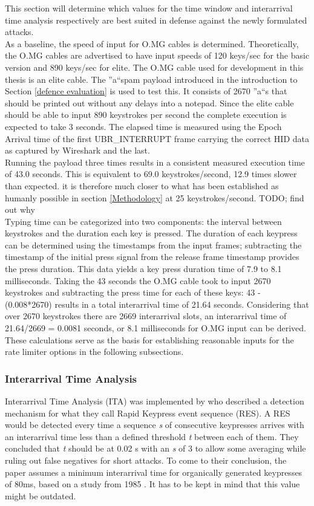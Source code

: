 This section will determine which values for the time window and interarrival time analysis respectively are best suited in defense against the newly formulated attacks.\\
As a baseline, the speed of input for O.MG cables is determined. Theoretically, the O.MG cables are advertised to have input speeds of 120 keys/sec for the basic version and 890 keys/sec for elite. The O.MG cable used for development in this thesis is an elite cable. The ''a``spam payload introduced in the introduction to Section \ref{defence evaluation} is used to test this. It consists of 2670 ''a``s that should be printed out without any delays into a notepad. Since the elite cable should be able to input 890 keystrokes per second the complete execution is expected to take 3 seconds. The elapsed time is measured using the Epoch Arrival time of the first UBR\_INTERRUPT frame carrying the correct HID data as captured by Wireshark and the last. \\
Running the payload three times results in a consistent measured execution time of 43.0 seconds. This is equivalent to 69.0 keystrokes/second, 12.9 times slower than expected. it is therefore much closer to what has been established as humanly possible in section \ref{Methodology} at 25 keystrokes/second. TODO; find out why \\
Typing time can be categorized into two components: the interval between keystrokes and the duration each key is pressed. The duration of each keypress can be determined using the timestamps from the input frames; subtracting the timestamp of the initial press signal from the release frame timestamp provides the press duration. This data yields a key press duration time of 7.9 to 8.1 milliseconds. Taking the 43 seconds the O.MG cable took to input 2670 keystrokes and subtracting the press time for each of these keys: 43 - (0.008*2670) results in a total interarrival time of 21.64 seconds. Considering that over 2670 keystrokes there are 2669 interarrival slots, an interarrival time of 21.64/2669 = 0.0081 seconds, or 8.1 milliseconds for O.MG input can be derived. These calculations serve as the basis for establishing reasonable inputs for the rate limiter options in the following subsections.  

\subsubsection{Interarrival Time Analysis}


Interarrival Time Analysis (ITA) was implemented by \cite{neunerUSBlockBlockingUSBBased2018} who described a detection mechanism for what they call Rapid Keypress event sequence (RES). A RES would be detected every time a sequence \emph{s} of consecutive keypresses arrives with an interarrival time less than a defined threshold \emph{t} between each of them. They concluded that \emph{t} should be at 0.02 s with an \emph{s} of 3 to allow some averaging while ruling out false negatives for short attacks. To come to their conclusion, the paper assumes a minimum interarrival time for organically generated keypresses of 80ms, based on a study from 1985 \cite{umphressIdentityVerificationKeyboard1985}. It has to be kept in mind that this value might be outdated.

